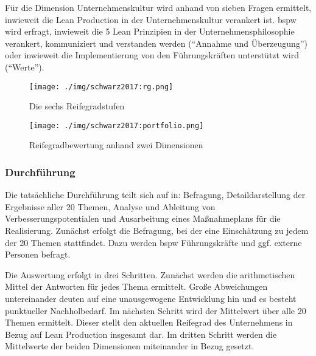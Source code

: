 Für die Dimension Unternehmenskultur wird anhand von sieben Fragen ermittelt, inwieweit die Lean Production in der Unternehmenskultur verankert ist. 
%
\Gls{bspw} wird erfragt, inwieweit die 5 Lean Prinzipien in der Unternehmensphilosophie verankert, kommuniziert und verstanden werden (``Annahme und Überzeugung'') oder inwieweit die Implementierung von den Führungskräften unterstützt wird (``Werte''). 

\begin{figure}[!ht] 
    \begin{minipage}{0.3\linewidth} 
    \begin{center}
      \texttt{[image: ./img/schwarz2017:rg.png]}
    \end{center}
      \caption[Die sechs Reifegradstufen]{Die sechs Reifegradstufen \cite{Schwarz2017}}\label{fig:reifegrade} 
    \end{minipage} 
    \hfill 
    \begin{minipage}{0.6\linewidth} 
 \texttt{[image: ./img/schwarz2017:portfolio.png]}
    \caption[Reifegradbewertung anhand zwei Dimensionen]{Reifegradbewertung anhand zwei Dimensionen \cite{Schwarz2017}}\label{fig:portfoliodarstellung} 
    \end{minipage} 
  \end{figure} 

\subsubsection{Durchführung}
Die tatsächliche Durchführung teilt sich auf in: Befragung, Detaildarstellung der Ergebnisse aller 20 Themen, Analyse und Ableitung von Verbesserungspotentialen und Ausarbeitung eines Maßnahmeplans für die Realisierung. 
%
Zunächst erfolgt die Befragung, bei der eine Einschätzung zu jedem der 20 Themen stattfindet. Dazu werden \gls{bspw} Führungskräfte und ggf. externe Personen befragt. 

Die Auswertung erfolgt in drei Schritten. Zunächst werden die arithmetischen Mittel der Antworten für jedes Thema ermittelt. Große Abweichungen untereinander deuten auf eine unausgewogene Entwicklung hin und es besteht punktueller Nachholbedarf. Im nächsten Schritt wird der Mittelwert über alle 20 Themen ermittelt. Dieser stellt den aktuellen Reifegrad des Unternehmens in Bezug auf Lean Production insgesamt dar. Im dritten Schritt werden die Mittelwerte der beiden Dimensionen miteinander in Bezug gesetzt. 

